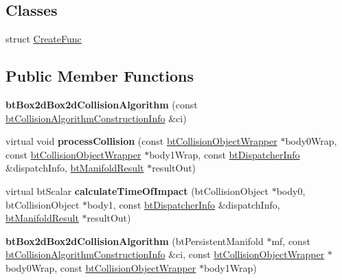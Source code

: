 \subsection*{Classes}
\begin{DoxyCompactItemize}
\item 
struct \hyperlink{structbtBox2dBox2dCollisionAlgorithm_1_1CreateFunc}{Create\+Func}
\end{DoxyCompactItemize}
\subsection*{Public Member Functions}
\begin{DoxyCompactItemize}
\item 
\mbox{\label{classbtBox2dBox2dCollisionAlgorithm_ada986fe8e7553712794c54b4fe1083b7}} 
{\bfseries bt\+Box2d\+Box2d\+Collision\+Algorithm} (const \hyperlink{structbtCollisionAlgorithmConstructionInfo}{bt\+Collision\+Algorithm\+Construction\+Info} \&ci)
\item 
\mbox{\label{classbtBox2dBox2dCollisionAlgorithm_a3846aea21893fc6bae2c122b5ae8c862}} 
virtual void {\bfseries process\+Collision} (const \hyperlink{structbtCollisionObjectWrapper}{bt\+Collision\+Object\+Wrapper} $\ast$body0\+Wrap, const \hyperlink{structbtCollisionObjectWrapper}{bt\+Collision\+Object\+Wrapper} $\ast$body1\+Wrap, const \hyperlink{structbtDispatcherInfo}{bt\+Dispatcher\+Info} \&dispatch\+Info, \hyperlink{classbtManifoldResult}{bt\+Manifold\+Result} $\ast$result\+Out)
\item 
\mbox{\label{classbtBox2dBox2dCollisionAlgorithm_accb9ce1c6603be1f06d52cc990a59fd3}} 
virtual bt\+Scalar {\bfseries calculate\+Time\+Of\+Impact} (bt\+Collision\+Object $\ast$body0, bt\+Collision\+Object $\ast$body1, const \hyperlink{structbtDispatcherInfo}{bt\+Dispatcher\+Info} \&dispatch\+Info, \hyperlink{classbtManifoldResult}{bt\+Manifold\+Result} $\ast$result\+Out)
\item 
\mbox{\label{classbtBox2dBox2dCollisionAlgorithm_accd5db2c4a57139e641ad36c1df4d9d8}} 
{\bfseries bt\+Box2d\+Box2d\+Collision\+Algorithm} (bt\+Persistent\+Manifold $\ast$mf, const \hyperlink{structbtCollisionAlgorithmConstructionInfo}{bt\+Collision\+Algorithm\+Construction\+Info} \&ci, const \hyperlink{structbtCollisionObjectWrapper}{bt\+Collision\+Object\+Wrapper} $\ast$body0\+Wrap, const \hyperlink{structbtCollisionObjectWrapper}{bt\+Collision\+Object\+Wrapper} $\ast$body1\+Wrap)

\end{DoxyCompactItemize}
